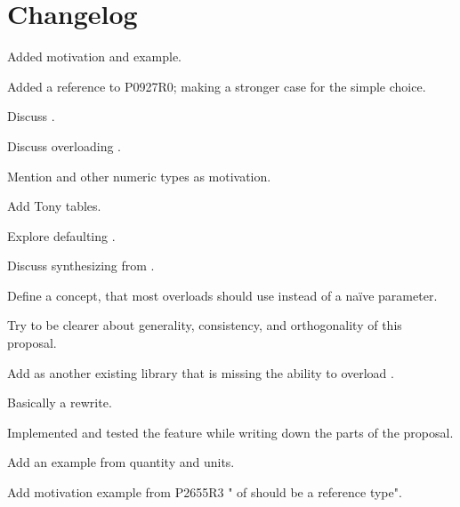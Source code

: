 \section{Changelog}
\begin{revision}
  \item Added  motivation and example.
  \item Added a reference to P0927R0; making a stronger case for the simple choice.
\end{revision}

\begin{revision}
  \item Discuss .
  \item Discuss overloading .
  \item Mention  and other numeric types as motivation.
\end{revision}

\begin{revision}
  \item Add Tony tables.
  \item Explore defaulting .
  \item Discuss synthesizing  from .
  \item Define a  concept, that most overloads should use instead of a naïve \bool parameter.
  \item Try to be clearer about generality, consistency, and orthogonality of this proposal.
  \item Add  as another existing library that is missing the ability to overload .
\end{revision}

\begin{revision}
\item Basically a rewrite.
\item Implemented and tested the feature while writing down the parts of the proposal.
\item Add an example from quantity and units.
\item Add motivation example from P2655R3 " of  should be a reference type".
\end{revision}


